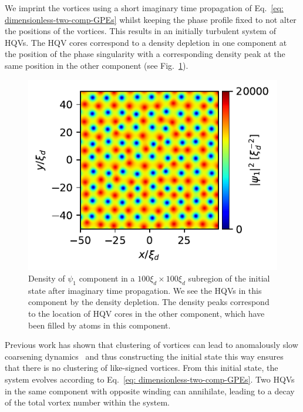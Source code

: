 We imprint the vortices using a short imaginary time propagation of
Eq.~\eqref{eq: dimensionless-two-comp-GPEs} whilst keeping the phase profile
fixed to not alter the positions of the vortices.
This results in an initially turbulent system of HQVs.
The HQV cores correspond to a density depletion in one component at the position
of the phase singularity with a corresponding density peak at the same position
in the other component (see Fig.~\ref{fig:initial-vortex-state}).
\begin{figure}
    \centering
    \includegraphics{gfx/ch-twoCompDynamics/init_state.pdf}
    \caption[Initial state containing half-quantum vortices]
    {Density of \(\psi_1 \) component in a \(100\xi_d\times100\xi_d\)
        subregion of the initial state after imaginary time propagation.
        We see the HQVs in this component by the density depletion.
        The density peaks correspond to the location of HQV cores in the other
        component, which have been filled by atoms in this
        component.\label{fig:initial-vortex-state}}
\end{figure}

Previous work has shown that clustering of vortices can lead to anomalously
slow coarsening dynamics~\cite{Karl2017} and thus constructing the initial
state this way ensures that there is no clustering of like-signed vortices.
From this initial state, the system evolves according to
Eq.~\eqref{eq: dimensionless-two-comp-GPEs}.
Two HQVs in the same component with opposite winding can annihilate, leading to
a decay of the total vortex number within the system.

